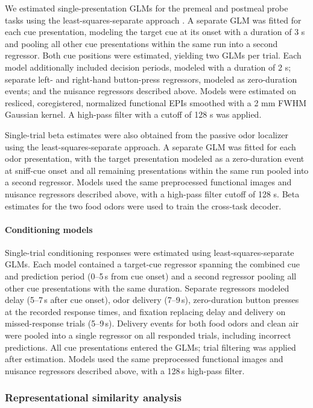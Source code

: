 \documentclass[9pt,twoside,lineno]{pnas-new}
\begin{document}
We estimated single-presentation GLMs for the premeal and postmeal probe tasks using the least-squares-separate approach \cite{mumford2012deconvolving}. A separate GLM was fitted for each cue presentation, modeling the target cue at its onset with a duration of 3 s and pooling all other cue presentations within the same run into a second regressor. Both cue positions were estimated, yielding two GLMs per trial. Each model additionally included decision periods, modeled with a duration of 2 s; separate left- and right-hand button-press regressors, modeled as zero-duration events; and the nuisance regressors described above. Models were estimated on resliced, coregistered, normalized functional EPIs smoothed with a 2 mm FWHM Gaussian kernel. A high-pass filter with a cutoff of 128 s was applied.

Single-trial beta estimates were also obtained from the passive odor localizer using the least-squares-separate approach. A separate GLM was fitted for each odor presentation, with the target presentation modeled as a zero-duration event at sniff-cue onset and all remaining presentations within the same run pooled into a second regressor. Models used the same preprocessed functional images and nuisance regressors described above, with a high-pass filter cutoff of 128 s. Beta estimates for the two food odors were used to train the cross-task decoder.

\paragraph*{Conditioning models}

Single-trial conditioning responses were estimated using least-squares-separate GLMs. Each model contained a target-cue regressor spanning the combined cue and prediction period (0--5\,s from cue onset) and a second regressor pooling all other cue presentations with the same duration. Separate regressors modeled delay (5--7\,s after cue onset), odor delivery (7--9\,s), zero-duration button presses at the recorded response times, and fixation replacing delay and delivery on missed-response trials (5--9\,s). Delivery events for both food odors and clean air were pooled into a single regressor on all responded trials, including incorrect predictions. All cue presentations entered the GLMs; trial filtering was applied after estimation. Models used the same preprocessed functional images and nuisance regressors described above, with a 128\,s high-pass filter.

\subsubsection*{Representational similarity analysis}
\end{document}
